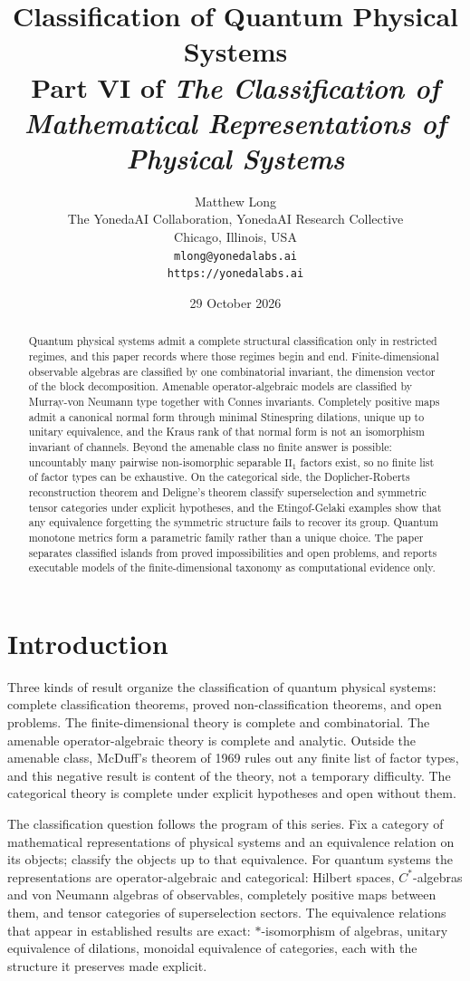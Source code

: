 \documentclass[11pt,letterpaper]{article}
\title{Classification of Quantum Physical Systems\\[4pt]
  {\normalsize Part VI of \emph{The Classification of Mathematical Representations of Physical Systems}}}
\author{Matthew Long\\
  \small The YonedaAI Collaboration, YonedaAI Research Collective\\
  \small Chicago, Illinois, USA\\
  \small \texttt{mlong@yonedalabs.ai}\\
  \small \texttt{https://yonedalabs.ai}}
\date{29 October 2026}
\theoremstyle{definition}
\theoremstyle{remark}
\begin{document}
\maketitle

\begin{abstract}
Quantum physical systems admit a complete structural classification only in restricted regimes, and this paper records where those regimes begin and end. Finite-dimensional observable algebras are classified by one combinatorial invariant, the dimension vector of the block decomposition. Amenable operator-algebraic models are classified by Murray-von Neumann type together with Connes invariants. Completely positive maps admit a canonical normal form through minimal Stinespring dilations, unique up to unitary equivalence, and the Kraus rank of that normal form is not an isomorphism invariant of channels. Beyond the amenable class no finite answer is possible: uncountably many pairwise non-isomorphic separable $\mathrm{II}_1$ factors exist, so no finite list of factor types can be exhaustive. On the categorical side, the Doplicher-Roberts reconstruction theorem and Deligne's theorem classify superselection and symmetric tensor categories under explicit hypotheses, and the Etingof-Gelaki examples show that any equivalence forgetting the symmetric structure fails to recover its group. Quantum monotone metrics form a parametric family rather than a unique choice. The paper separates classified islands from proved impossibilities and open problems, and reports executable models of the finite-dimensional taxonomy as computational evidence only.
\end{abstract}

\section{Introduction}

Three kinds of result organize the classification of quantum physical systems: complete classification theorems, proved non-classification theorems, and open problems. The finite-dimensional theory is complete and combinatorial. The amenable operator-algebraic theory is complete and analytic. Outside the amenable class, McDuff's theorem of 1969 rules out any finite list of factor types, and this negative result is content of the theory, not a temporary difficulty. The categorical theory is complete under explicit hypotheses and open without them.

The classification question follows the program of this series. Fix a category of mathematical representations of physical systems and an equivalence relation on its objects; classify the objects up to that equivalence. For quantum systems the representations are operator-algebraic and categorical: Hilbert spaces, $C^*$-algebras and von Neumann algebras of observables, completely positive maps between them, and tensor categories of superselection sectors. The equivalence relations that appear in established results are exact: $*$-isomorphism of algebras, unitary equivalence of dilations, monoidal equivalence of categories, each with the structure it preserves made explicit.
\end{document}
